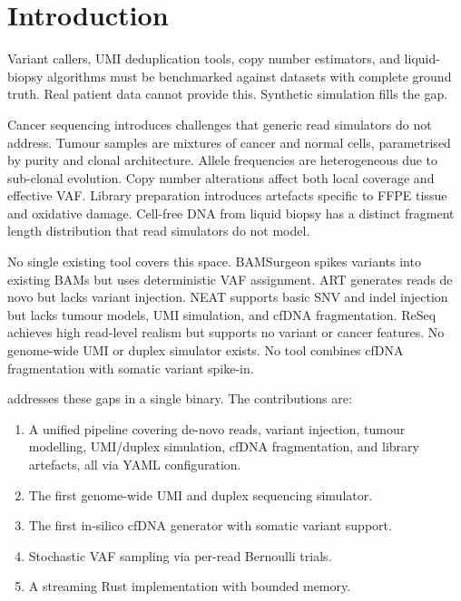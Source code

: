 \section{Introduction}
\label{sec:intro}

Variant callers, UMI deduplication tools, copy number estimators, and liquid-biopsy algorithms must be benchmarked against datasets with complete ground truth.
Real patient data cannot provide this.
Synthetic simulation fills the gap.

Cancer sequencing introduces challenges that generic read simulators do not address.
Tumour samples are mixtures of cancer and normal cells, parametrised by purity and clonal architecture.
Allele frequencies are heterogeneous due to sub-clonal evolution.
Copy number alterations affect both local coverage and effective VAF.
Library preparation introduces artefacts specific to FFPE tissue and oxidative damage.
Cell-free DNA from liquid biopsy has a distinct fragment length distribution that read simulators do not model.

No single existing tool covers this space.
BAMSurgeon\autocite{ewing2015bamsurgeon} spikes variants into existing BAMs but uses deterministic VAF assignment.
ART\autocite{huang2012art} generates reads de novo but lacks variant injection.
NEAT\autocite{stephens2016neat} supports basic SNV and indel injection but lacks tumour models, UMI simulation, and cfDNA fragmentation.
ReSeq\autocite{schmeing2021reseq} achieves high read-level realism but supports no variant or cancer features.
No genome-wide UMI or duplex simulator exists.
No tool combines cfDNA fragmentation with somatic variant spike-in.

\varforge{} addresses these gaps in a single binary.
The contributions are:
\begin{enumerate}[leftmargin=*, label=(\roman*), nosep]
  \item A unified pipeline covering de-novo reads, variant injection, tumour modelling, UMI/duplex simulation, cfDNA fragmentation, and library artefacts, all via YAML configuration.
  \item The first genome-wide UMI and duplex sequencing simulator.
  \item The first in-silico cfDNA generator with somatic variant support.
  \item Stochastic VAF sampling via per-read Bernoulli trials.
  \item A streaming Rust implementation with bounded memory.
\end{enumerate}
